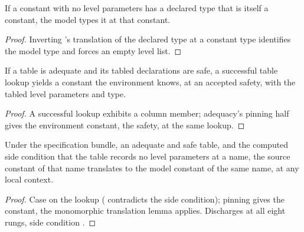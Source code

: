 \begin{lemma}\label{lem:Witness-hasType_const_nil}
 \leanok
{}
If a constant with no level parameters has a declared type that is itself a constant, the model types
it at that constant.
\end{lemma}

\begin{proof} \leanok
{}
 Inverting 's translation of the declared type at a constant type
identifies the model type and forces an empty level list.
\end{proof}

\begin{lemma}\label{lem:Witness-tableDeclPin}
 \leanok
{}
If a table is adequate and its tabled declarations are safe, a successful table lookup yields a
constant the environment knows, at an accepted safety, with the tabled level parameters and type.
\end{lemma}

\begin{proof} \leanok
{}
 A successful lookup exhibits a column member; adequacy's pinning half gives the
environment constant,  the safety, at the same lookup.
\end{proof}

\begin{lemma}\label{lem:Witness-trExprS_const_of_table}
 \leanok
{}
Under the specification bundle, an adequate and safe table, and the computed side condition that the
table records no level parameters at a name, the source constant of that name translates to the model
constant of the same name, at any local context.
\end{lemma}

\begin{proof} \leanok
{}
 Case on the lookup ( contradicts the side condition); pinning gives the
constant, the monomorphic translation lemma applies. Discharges  at all eight rungs, side
condition .
\end{proof}

